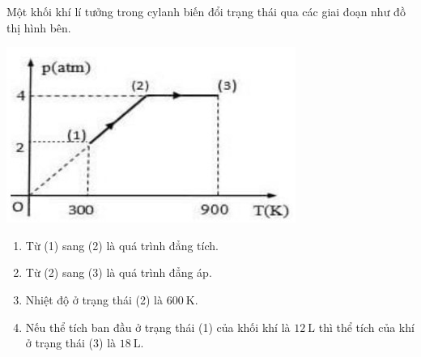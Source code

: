 \begin{ex}
	Một khối khí lí tưởng trong cylanh biến đổi trạng thái qua các giai đoạn như đồ thị hình bên.
	\begin{center}
		\includegraphics[width=0.3\linewidth]{figs/VN12-Y24-PH-SYL-014P-17}
	\end{center}
	\begin{enumerate}[label=\alph*)]
		\item Từ (1) sang (2) là quá trình đẳng tích.
		\item Từ (2) sang (3) là quá trình đẳng áp.
		\item Nhiệt độ ở trạng thái (2) là $\SI{600}{\kelvin}$.
		\item  Nếu thể tích ban đầu ở trạng thái (1) của khối khí là $\SI{12}{\liter}$ thì thể tích của khí ở trạng thái (3) là $\SI{18}{\liter}$.
	\end{enumerate}
	
\end{ex}
